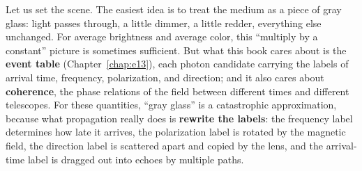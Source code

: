 Let us set the scene. The easiest idea is to treat the medium as a piece of gray glass: light passes through, a little dimmer, a little redder, everything else unchanged. For average brightness and average color, this ``multiply by a constant'' picture is sometimes sufficient. But what this book cares about is the \textbf{event table} (Chapter~\ref{chap:e13}), each photon candidate carrying the labels of arrival time, frequency, polarization, and direction; and it also cares about \textbf{coherence}, the phase relations of the field between different times and different telescopes. For these quantities, ``gray glass'' is a catastrophic approximation, because what propagation really does is \textbf{rewrite the labels}: the frequency label determines how late it arrives, the polarization label is rotated by the magnetic field, the direction label is scattered apart and copied by the lens, and the arrival-time label is dragged out into echoes by multiple paths.

